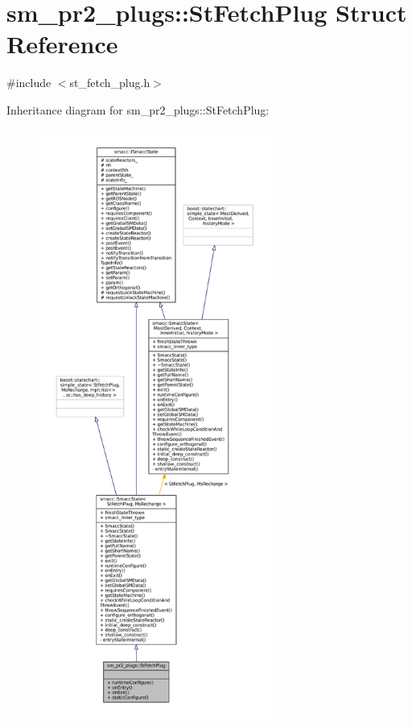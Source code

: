 \hypertarget{structsm__pr2__plugs_1_1StFetchPlug}{}\section{sm\+\_\+pr2\+\_\+plugs\+:\+:St\+Fetch\+Plug Struct Reference}
\label{structsm__pr2__plugs_1_1StFetchPlug}


{\ttfamily \#include $<$st\+\_\+fetch\+\_\+plug.\+h$>$}



Inheritance diagram for sm\+\_\+pr2\+\_\+plugs\+:\+:St\+Fetch\+Plug\+:
\nopagebreak
\begin{figure}[H]
\begin{center}
\leavevmode
\includegraphics[height=550pt]{structsm__pr2__plugs_1_1StFetchPlug__inherit__graph}
\end{center}
\end{figure}


